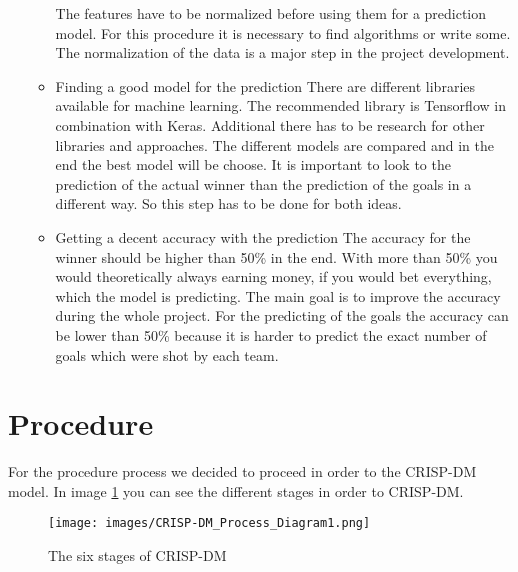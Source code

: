 \begin{itemize}
\begin{itemize}
			The features have to be normalized before using them for a prediction model. For this procedure it is necessary to find algorithms or write some. The normalization of the data is a major step in the project development.
			\item Finding a good model for the prediction 
			There are different libraries available for machine learning. The recommended library is Tensorflow in combination with Keras. Additional there has to be research for other libraries and approaches. The different models are compared and in the end the best model will be choose. It is important to look to the prediction of the actual winner than the prediction of the goals in a different way. So this step has to be done for both ideas.
			\item Getting a decent accuracy with the prediction \newline
			The accuracy for the winner should be higher than 50\% in the end. With more than 50\% you would theoretically always earning money, if you would bet everything, which the model is predicting. The main goal is to improve the accuracy during the whole project. For the predicting of the goals the accuracy can be lower than 50\% because it is harder to predict the exact number of goals which were shot by each team.
		\end{itemize}
\end{itemize}
\section{Procedure}

For the procedure process we decided to proceed in order to the CRISP-DM model. In image \ref{CRISImage} you can see the different stages in order to CRISP-DM.

\begin{figure}[h]
\centering
\texttt{[image: images/CRISP-DM\_Process\_Diagram1.png]}
\caption{The six stages of CRISP-DM \cite{CRISPDig:2012}}
\label{CRISImage}
\end{figure}


